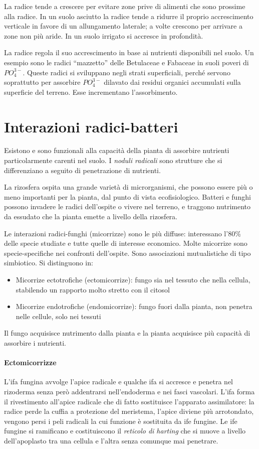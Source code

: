 \documentclass[a4paper,12pt]{book}
\begin{document}
La radice tende a crescere per evitare zone prive di alimenti che sono prossime alla radice. 
In un suolo asciutto la radice tende a ridurre il proprio accrescimento verticale in favore di un allungamento laterale; a volte crescono per arrivare a zone non più aride. In un suolo irrigato si accresce in profondità.

La radice regola il suo accrescimento in base ai nutrienti disponibili nel suolo. 
Un esempio sono le
radici “mazzetto” delle Betulaceae e Fabaceae in
suoli poveri di $PO_{4}^{3-}$.
Queste
radici
si
sviluppano
negli
strati
superficiali, perché servono soprattutto per
assorbire $PO_{4}^{3-}$ dilavato dai residui organici
accumulati sulla superficie del terreno. Esse incrementano l'assorbimento.

\section{Interazioni radici-batteri}
Esistono e sono funzionali alla capacità della pianta di assorbire nutrienti particolarmente carenti nel suolo. I \emph{noduli radicali} sono strutture che si differenziano a seguito di penetrazione di nutrienti.

La rizosfera ospita una grande varietà di microrganismi, che possono essere più o meno
importanti per la pianta, dal punto di vista ecofisiologico.
Batteri e funghi possono invadere le radici dell'ospite o vivere nel terreno, e traggono nutrimento da essudato che la pianta emette a livello della rizosfera.

Le interazioni radici-funghi (micorrizze) sono le più diffuse: interessano l'80\% delle specie studiate e tutte quelle di interesse economico. Molte micorrize sono specie-specifiche nei confronti dell'ospite. Sono associazioni mutualistiche di tipo simbiotico. Si distinguono in:
\begin{itemize}
\item{Micorrize ectotrofiche (ectomicorrize): fungo sia nel tessuto che nella cellula, stabilendo un rapporto molto stretto con il citosol}
\item{Micorrize endotrofiche (endomicorrize): fungo fuori dalla pianta, non penetra nelle cellule, solo nei tessuti}
\end{itemize}

Il fungo acquisisce nutrimento dalla pianta e la pianta acquisisce più capacità di assorbire i nutrienti.

\paragraph{Ectomicorrizze}
L'ifa fungina avvolge l'apice radicale e qualche ifa si accresce e penetra nel rizoderma senza però addentrarsi nell'endoderma e nei fasci vascolari. L'ifa forma il rivestimento all'apice radicale che di fatto sostituisce l'apparato assimilatore: la radice perde la cuffia a protezione del meristema, l'apice diviene più arrotondato, vengono persi i peli radicali la cui funzione è sostituita da ife fungine. Le ife fungine si ramificano e costituiscono il \emph{reticolo di harting} che si muove a livello dell'apoplasto tra una cellula e l'altra senza comunque mai penetrare. 
\end{document}
